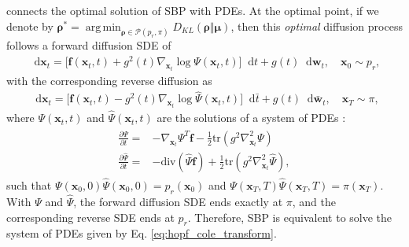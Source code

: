 \documentclass{article}
\theoremstyle{definition}
\theoremstyle{remark}
\DeclareMathOperator*{\argmin}{arg\,min}
\newcommand*\diff{\mathop{}\!\mathrm{d}}
\begin{document}
	
	\citet{chen2021likelihood} connects the optimal solution of SBP with PDEs. At the optimal point, if we denote by $\bm{\rho}^{*}=\argmin_{\bm{\rho}\in\mathcal{P}(p_{r},\pi)}D_{KL}(\bm{\rho}\Vert\bm{\mu})$, then this \textit{optimal} diffusion process follows a forward diffusion SDE \cite{chen2021likelihood} of
	\begin{align*}
	\diff\mathbf{x}_{t}=\big[\mathbf{f}(\mathbf{x}_{t},t)+g^{2}(t)\nabla_{\mathbf{x}_{t}}\log{\Psi(\mathbf{x}_{t},t)}\big]\diff t+g(t)\diff\mathbf{w}_{t}, \quad\mathbf{x}_{0}\sim p_{r},
	\end{align*}
	with the corresponding reverse diffusion as
	\begin{align*}
	\diff\mathbf{x}_{t}=\big[\mathbf{f}(\mathbf{x}_{t},t)-g^{2}(t)\nabla_{\mathbf{x}_{t}}\log{\hat{\Psi}(\mathbf{x}_{t},t)}\big]\diff \bar{t}+g(t)\diff\mathbf{\bar{w}}_{t}, \quad\mathbf{x}_{T}\sim \pi,
	\end{align*}
	where $\Psi(\mathbf{x}_{t},t)$ and $\hat{\Psi}(\mathbf{x}_{t},t)$ are the solutions of a system of PDEs \cite{leger2021hopf}:
	\begin{align}\label{eq:hopf_cole_transform}
	\begin{split}
	\frac{\partial\Psi}{\partial t}=&-\nabla_{\mathbf{x}_{t}}\Psi^{T}\mathbf{f}-\frac{1}{2}\text{tr}(g^{2}\nabla_{\mathbf{x}_{t}}^{2}\Psi)\\
	\frac{\partial\hat{\Psi}}{\partial t}=&-\text{div}(\hat{\Psi}\mathbf{f})+\frac{1}{2}\text{tr}(g^{2}\nabla_{\mathbf{x}_{t}}^{2}\hat{\Psi}),
	\end{split}
	\end{align}
	such that $\Psi(\mathbf{x}_{0},0)\hat{\Psi}(\mathbf{x}_{0},0)=p_{r}(\mathbf{x}_{0})$ and $\Psi(\mathbf{x}_{T},T)\hat{\Psi}(\mathbf{x}_{T},T)=\pi(\mathbf{x}_{T})$. With $\Psi$ and $\hat{\Psi}$, the forward diffusion SDE ends exactly at $\pi$, and the corresponding reverse SDE ends at $p_{r}$. Therefore, SBP is equivalent to solve the system of PDEs given by Eq. \eqref{eq:hopf_cole_transform}.
	
\end{document}
